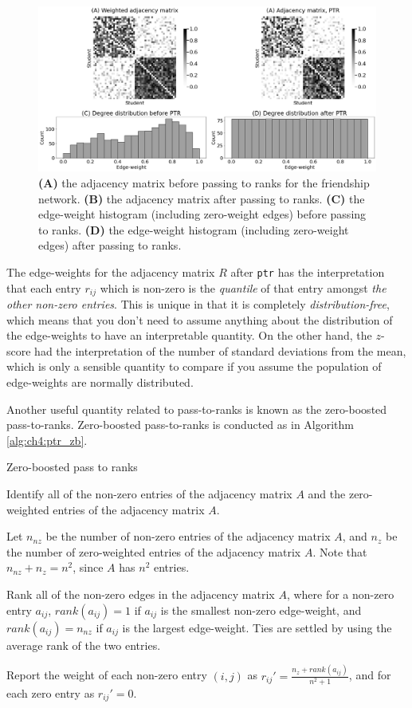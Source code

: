 \begin{figure}[h]
    \centering
    \includegraphics[width=\linewidth]{representations/ch4/Images/ptr.png}
    \caption[Passing to ranks to normalize edge-weights]{\textbf{(A)} the adjacency matrix before passing to ranks for the friendship network. \textbf{(B)} the adjacency matrix after passing to ranks. \textbf{(C)} the edge-weight histogram (including zero-weight edges) before passing to ranks. \textbf{(D)} the edge-weight histogram (including zero-weight edges) after passing to ranks.}
    \label{fig:ch4:ptr}
\end{figure}
The edge-weights for the adjacency matrix $R$ after \texttt{ptr} has the interpretation that each entry $r_{ij}$ which is non-zero is the \emph{quantile} of that entry amongst \emph{the other non-zero entries}. This is unique in that it is completely \emph{distribution-free}, which means that you don't need to assume anything about the distribution of the edge-weights to have an interpretable quantity. On the other hand, the $z$-score had the interpretation of the number of standard deviations from the mean, which is only a sensible quantity to compare if you assume the population of edge-weights are normally distributed.


Another useful quantity related to pass-to-ranks is known as the zero-boosted pass-to-ranks. Zero-boosted pass-to-ranks is conducted as in Algorithm \ref{alg:ch4:ptr_zb}.

\begin{algorithm}[h]
\SetAlgoLined
\caption{Zero-boosted pass to ranks}
    Identify all of the non-zero entries of the adjacency matrix $A$ and the zero-weighted entries of the adjacency matrix $A$.

    Let $n_{nz}$ be the number of non-zero entries of the adjacency matrix $A$, and $n_z$ be the number of zero-weighted entries of the adjacency matrix $A$. Note that $n_{nz} + n_z = n^2$, since $A$ has $n^2$ entries.

    Rank all of the non-zero edges in the adjacency matrix $A$, where for a non-zero entry $a_{ij}$, $rank(a_{ij}) = 1$ if $a_{ij}$ is the smallest non-zero edge-weight, and $rank(a_{ij}) = n_{nz}$ if $a_{ij}$ is the largest edge-weight. Ties are settled by using the average rank of the two entries.

    Report the weight of each non-zero entry $(i,j)$ as $r_{ij}' = \frac{n_z + rank(a_{ij})}{n^2 + 1}$, and for each zero entry as $r_{ij}' = 0$.
\end{algorithm}

